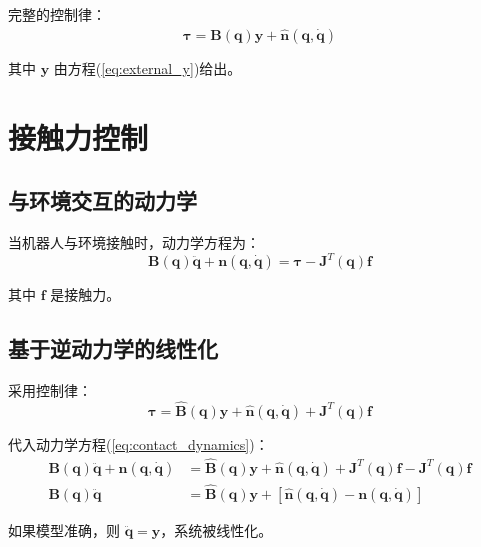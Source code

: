 \documentclass[12pt,a4paper]{article}
\begin{document}
完整的控制律：
\begin{equation}
\boldsymbol{\tau} = \hat{\mathbf{B}}(\mathbf{q})\mathbf{y} + \hat{\mathbf{n}}(\mathbf{q},\dot{\mathbf{q}})
\label{eq:complete_external_control}
\end{equation}

其中 $\mathbf{y}$ 由方程(\ref{eq:external_y})给出。

\section{接触力控制}

\subsection{与环境交互的动力学}

当机器人与环境接触时，动力学方程为：
\begin{equation}
\mathbf{B}(\mathbf{q})\ddot{\mathbf{q}} + \mathbf{n}(\mathbf{q},\dot{\mathbf{q}}) = \boldsymbol{\tau} - \mathbf{J}^T(\mathbf{q})\mathbf{f}
\label{eq:contact_dynamics}
\end{equation}

其中 $\mathbf{f}$ 是接触力。

\subsection{基于逆动力学的线性化}

采用控制律：
\begin{equation}
\boldsymbol{\tau} = \hat{\mathbf{B}}(\mathbf{q})\mathbf{y} + \hat{\mathbf{n}}(\mathbf{q},\dot{\mathbf{q}}) + \mathbf{J}^T(\mathbf{q})\mathbf{f}
\label{eq:force_control_law}
\end{equation}

代入动力学方程(\ref{eq:contact_dynamics})：
\begin{align*}
\mathbf{B}(\mathbf{q})\ddot{\mathbf{q}} + \mathbf{n}(\mathbf{q},\dot{\mathbf{q}}) &= \hat{\mathbf{B}}(\mathbf{q})\mathbf{y} + \hat{\mathbf{n}}(\mathbf{q},\dot{\mathbf{q}}) + \mathbf{J}^T(\mathbf{q})\mathbf{f} - \mathbf{J}^T(\mathbf{q})\mathbf{f} \\
\mathbf{B}(\mathbf{q})\ddot{\mathbf{q}} &= \hat{\mathbf{B}}(\mathbf{q})\mathbf{y} + [\hat{\mathbf{n}}(\mathbf{q},\dot{\mathbf{q}}) - \mathbf{n}(\mathbf{q},\dot{\mathbf{q}})]
\end{align*}

如果模型准确，则 $\ddot{\mathbf{q}} = \mathbf{y}$，系统被线性化。
\end{document}
